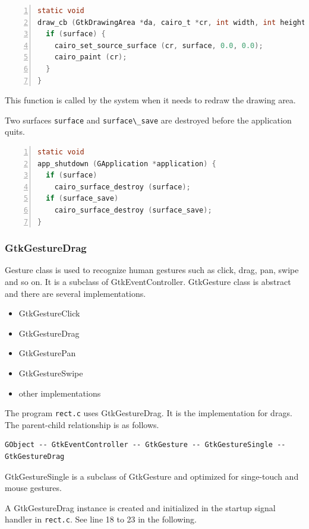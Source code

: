 \begin{lstlisting}[language=C, numbers=left]
static void
draw_cb (GtkDrawingArea *da, cairo_t *cr, int width, int height, gpointer user_data) {
  if (surface) {
    cairo_set_source_surface (cr, surface, 0.0, 0.0);
    cairo_paint (cr);
  }
}
\end{lstlisting}

This function is called by the system when it needs to redraw the
drawing area.

Two surfaces \passthrough{\lstinline!surface!} and
\passthrough{\lstinline!surface\_save!} are destroyed before the
application quits.

\begin{lstlisting}[language=C, numbers=left]
static void
app_shutdown (GApplication *application) {
  if (surface)
    cairo_surface_destroy (surface);
  if (surface_save)
    cairo_surface_destroy (surface_save);
}
\end{lstlisting}

\subsubsection{GtkGestureDrag}\label{gtkgesturedrag}

Gesture class is used to recognize human gestures such as click, drag,
pan, swipe and so on. It is a subclass of GtkEventController. GtkGesture
class is abstract and there are several implementations.

\begin{itemize}
\tightlist
\item
  GtkGestureClick
\item
  GtkGestureDrag
\item
  GtkGesturePan
\item
  GtkGestureSwipe
\item
  other implementations
\end{itemize}

The program \passthrough{\lstinline!rect.c!} uses GtkGestureDrag. It is
the implementation for drags. The parent-child relationship is as
follows.

\begin{lstlisting}
GObject -- GtkEventController -- GtkGesture -- GtkGestureSingle -- GtkGestureDrag
\end{lstlisting}

GtkGestureSingle is a subclass of GtkGesture and optimized for
singe-touch and mouse gestures.

A GtkGestureDrag instance is created and initialized in the startup
signal handler in \passthrough{\lstinline!rect.c!}. See line 18 to 23 in
the following.

